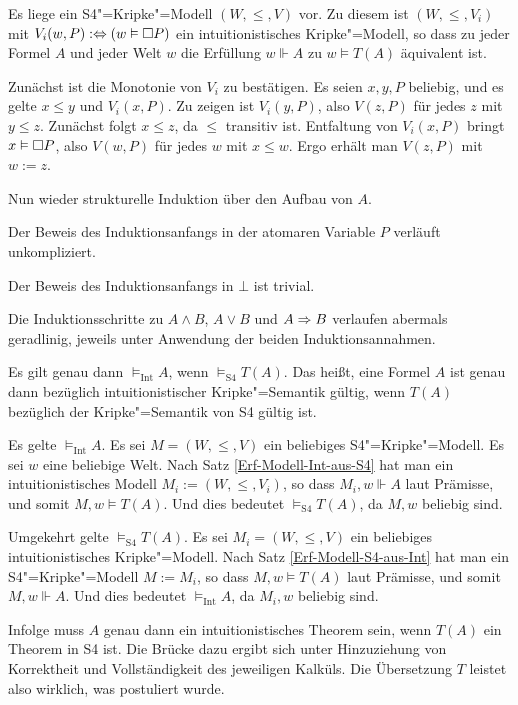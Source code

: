 \begin{Satz}\label{Erf-Modell-Int-aus-S4}
Es liege ein S4"=Kripke"=Modell $(W,\le,V)$ vor. Zu diesem ist
$(W,\le,V_i)$ mit $V_i(w,P):\Leftrightarrow (w\vDash\Box P)$ ein
intuitionistisches Kripke"=Modell, so dass zu jeder Formel $A$ und jeder
Welt $w$ die Erfüllung $w\Vdash A$ zu $w\models T(A)$ äquivalent ist.
\end{Satz}
\begin{Beweis}[Beweisskizze]
Zunächst ist die Monotonie von $V_i$ zu bestätigen. Es seien $x,y,P$
beliebig, und es gelte $x\le y$ und $V_i(x,P)$. Zu zeigen ist
$V_i(y,P)$, also $V(z,P)$ für jedes $z$ mit $y\le z$. Zunächst
folgt $x\le z$, da $\le$ transitiv ist. Entfaltung von $V_i(x,P)$
bringt $x\vDash\Box P$, also $V(w,P)$ für jedes $w$ mit $x\le w$.
Ergo erhält man $V(z,P)$ mit $w:=z$.

Nun wieder strukturelle Induktion über den Aufbau von $A$.

Der Beweis des Induktionsanfangs in der atomaren Variable $P$ verläuft
unkompliziert.

Der Beweis des Induktionsanfangs in $\bot$ ist trivial.

Die Induktionsschritte zu $A\land B$, $A\lor B$ und $A\Rightarrow B$ verlaufen
abermals geradlinig, jeweils unter Anwendung der beiden
Induktionsannahmen.\,\qedsymbol
\end{Beweis}

\begin{Satz}
Es gilt genau dann $\models_\text{Int} A$, wenn $\models_\text{S4} T(A)$.
Das heißt, eine Formel $A$ ist genau dann bezüglich intuitionistischer
Kripke"=Semantik gültig, wenn $T(A)$ bezüglich der Kripke"=Semantik von
S4 gültig ist.
\end{Satz}
\begin{Beweis}
Es gelte $\models_\text{Int} A$. Es sei $M=(W,\le,V)$ ein beliebiges
S4"=Kripke"=Modell. Es sei $w$ eine beliebige Welt. Nach Satz
\ref{Erf-Modell-Int-aus-S4}
hat man ein intuitionistisches Modell $M_i:=(W,\le,V_i)$, so dass
$M_i,w\Vdash A$ laut Prämisse, und somit $M,w\models T(A)$. Und dies
bedeutet $\models_\text{S4} T(A)$, da $M,w$ beliebig sind.

Umgekehrt gelte $\models_\text{S4} T(A)$. Es sei $M_i=(W,\le,V)$ ein
beliebiges intuitionistisches Kripke"=Modell. Nach Satz
\ref{Erf-Modell-S4-aus-Int} hat man
ein S4"=Kripke"=Modell $M:=M_i$, so dass $M,w\models T(A)$ laut
Prämisse, und somit $M,w\Vdash A$. Und dies bedeutet
$\models_\text{Int} A$, da $M_i,w$ beliebig sind.\,\qedsymbol
\end{Beweis}

\noindent
Infolge muss $A$ genau dann ein intuitionistisches Theorem sein,
wenn $T(A)$ ein Theorem in S4 ist. Die Brücke dazu ergibt sich
unter Hinzuziehung von Korrektheit und Vollständigkeit des jeweiligen
Kalküls. Die Übersetzung $T$ leistet also wirklich, was postuliert
wurde.
